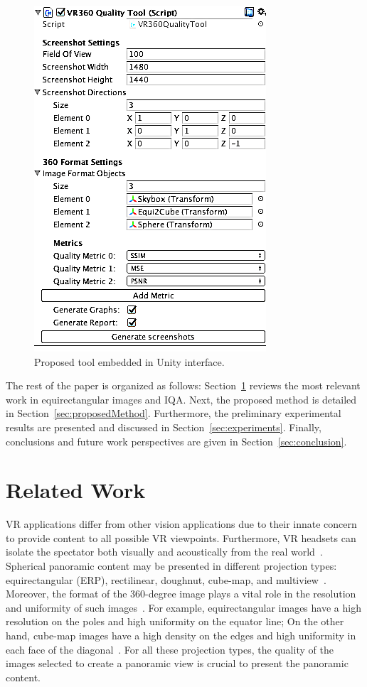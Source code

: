 \documentclass[10pt,conference,pdftex]{IEEEtran}
\begin{document}
\begin{figure}[ht!]
    \centering
    \includegraphics[width=0.73\linewidth]{figs/tool_edit.png}%
    \caption{Proposed tool embedded in Unity interface.}
    \label{fig:tool}
\end{figure}


The rest of the paper is organized as follows: Section~\ref{sec:related_work} reviews the most relevant work in equirectangular images and IQA. Next, the proposed method is detailed in Section~\ref{sec:proposedMethod}. Furthermore, the preliminary experimental results are presented and discussed in Section~\ref{sec:experiments}. Finally, conclusions and future work perspectives are given in Section~\ref{sec:conclusion}.

\section{Related Work}\label{sec:related_work}

VR applications differ from other vision applications due to their innate concern to provide content to all possible VR viewpoints. Furthermore, VR headsets can isolate the spectator both visually and acoustically from the real world~\cite{fuchs2017virtual}.
Spherical panoramic content may be presented in different projection types: equirectangular (ERP), rectilinear, doughnut, cube-map, and multiview~\cite{zakharchenko2016quality}. Moreover, the format of the 360-degree image plays a vital role in the resolution and uniformity of such images~\cite{dunn2017resolution}. For example, equirectangular images have a high resolution on the poles and high uniformity on the equator line; On the other hand, cube-map images have a high density on the edges and high uniformity in each face of the diagonal~\cite{duanmu:2018}. For all these projection types, the quality of the images selected to create a panoramic view is crucial to present the panoramic content.  \par
\end{document}
